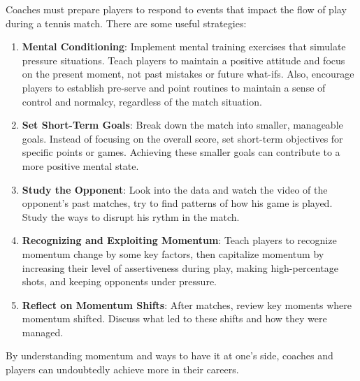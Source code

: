 Coaches must prepare players to respond to events that impact the flow of play during a tennis match. There are some useful strategies:

\begin{enumerate}
    \item \textbf{Mental Conditioning}: Implement mental training exercises that simulate pressure situations. Teach players to maintain a positive attitude and focus on the present moment, not past mistakes or future what-ifs. Also, encourage players to establish pre-serve and point routines to maintain a sense of control and normalcy, regardless of the match situation.
    \item \textbf{Set Short-Term Goals}: Break down the match into smaller, manageable goals. Instead of focusing on the overall score, set short-term objectives for specific points or games. Achieving these smaller goals can contribute to a more positive mental state.
    \item \textbf{Study the Opponent}: Look into the data and watch the video of the opponent's past matches, try to find patterns of how his game is played. Study the ways to disrupt his rythm in the match.
    \item \textbf{Recognizing and Exploiting Momentum}: Teach players to recognize momentum change by some key factors, then capitalize momentum by increasing their level of assertiveness during play, making high-percentage shots, and keeping opponents under pressure.
    \item \textbf{Reflect on Momentum Shifts}: After matches, review key moments where momentum shifted. Discuss what led to these shifts and how they were managed.
\end{enumerate}

By understanding momentum and ways to have it at one's side, coaches and players can undoubtedly achieve more in their careers.